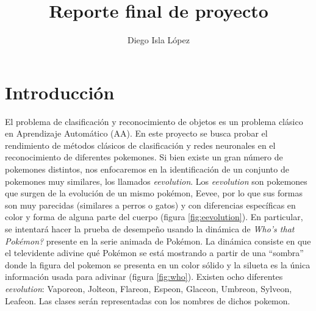 \documentclass[transmag]{IEEEtran}
\begin{document}
\title{Reporte final de proyecto}

\author{Diego Isla López}



\maketitle

\section{Introducción}


El problema de clasificación y reconocimiento de objetos es un problema clásico en Aprendizaje Automático (AA). En este proyecto se busca probar el rendimiento de métodos clásicos de clasificación y redes neuronales en el reconocimiento de diferentes pokemones. Si bien existe un gran número de pokemones distintos, nos enfocaremos en la identificación de un conjunto de pokemones muy similares, los llamados \textit{eevolution}. Los \textit{eevolution} son pokemones que surgen de la evolución de un mismo pokémon, Eevee, por lo que sus formas son muy parecidas (similares a perros o gatos) y con diferencias específicas en color y forma de alguna parte del cuerpo (figura \ref{fig:eevolution}). En particular, se intentará hacer la prueba de desempeño usando la dinámica de \textit{Who's that Pokémon?} presente en la serie animada de Pokémon. La dinámica consiste en que el televidente adivine qué Pokémon se está mostrando a partir de una ``sombra'' donde la figura del pokemon se presenta en un color sólido y la silueta es la única información usada para adivinar (figura \ref{fig:who}). Existen ocho diferentes \textit{eevolution}: Vaporeon, Jolteon, Flareon, Espeon, Glaceon, Umbreon, Sylveon, Leafeon. Las clases serán representadas con los nombres de dichos pokemon.
 
\end{document}
